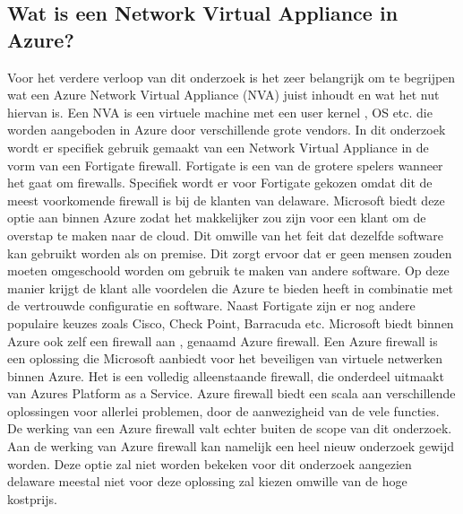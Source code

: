 \newpage
\subsection{Wat is een Network Virtual Appliance in Azure?}
Voor het verdere verloop van dit onderzoek is het zeer belangrijk om te begrijpen wat een Azure Network Virtual Appliance (NVA) juist inhoudt en wat het nut hiervan is. Een NVA is een virtuele machine met een user kernel , OS etc. die worden aangeboden in Azure door verschillende grote vendors. In dit onderzoek wordt er specifiek gebruik gemaakt van een Network Virtual Appliance in de vorm van een Fortigate firewall. Fortigate is een van de grotere spelers wanneer het gaat om firewalls. Specifiek wordt er voor Fortigate gekozen omdat dit de meest voorkomende firewall is bij de klanten van delaware. Microsoft biedt deze optie aan binnen Azure zodat het makkelijker zou zijn voor een klant om de overstap te maken naar de cloud. Dit omwille van het feit dat dezelfde software kan gebruikt worden als on premise. Dit zorgt ervoor dat er geen mensen zouden moeten omgeschoold worden om gebruik te maken van andere software. Op deze manier krijgt de klant alle voordelen die Azure te bieden heeft in combinatie met de vertrouwde configuratie en software. Naast Fortigate zijn er nog andere populaire keuzes zoals Cisco, Check Point, Barracuda etc. \autocite{MicrosoftNVA} 
Microsoft biedt binnen Azure ook zelf een firewall aan , genaamd Azure firewall. Een Azure firewall is een oplossing die Microsoft aanbiedt voor het beveiligen van virtuele netwerken binnen Azure. \autocite{Cooke} Het is een volledig alleenstaande firewall, die onderdeel uitmaakt van Azures Platform as a Service. \newline \autocite{Seferlis2018} Azure firewall biedt een scala aan verschillende oplossingen voor allerlei problemen, door de aanwezigheid van de vele functies. De werking van een Azure firewall valt echter buiten de scope van dit onderzoek. Aan de werking van Azure firewall kan namelijk een heel nieuw onderzoek gewijd worden. Deze optie zal niet worden bekeken voor dit onderzoek aangezien delaware meestal niet voor deze oplossing zal kiezen omwille van de hoge kostprijs. 

